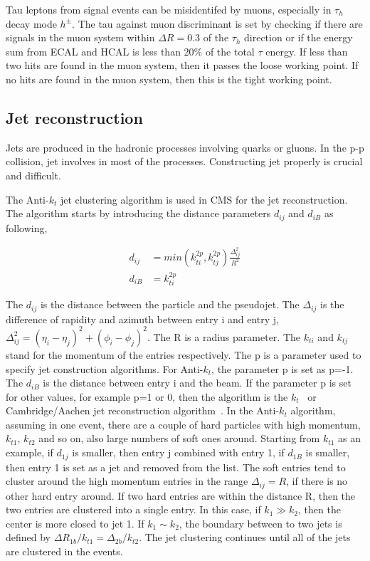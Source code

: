 Tau leptons from signal events can be misidentifed by muons, especially in $\tau_{h}$ decay mode $h^{\pm}$. The tau against muon discriminant is set by checking if there are signals in the muon system within $\Delta R=0.3$ of the $\tau_{h}$ direction or if the energy sum from ECAL and HCAL is less than 20$\%$ of the total $\tau$ energy. If less than two hits are found in the muon system, then it passes the loose working point. If no hits are found in the muon system, then this is the tight working point. 

\subsection{Jet reconstruction}
Jets are produced in the hadronic processes involving quarks or gluons. In the p-p collision, jet involves in most of the processes. Constructing jet properly is crucial and difficult. 

The Anti-$k_{t}$ jet clustering algorithm is used in CMS for the jet reconstruction. The algorithm starts by introducing the distance parameters $d_{ij}$ and $d_{iB}$ as following,

\begin{align*}
d_{ij}&=min(k_{ti}^{2p},k_{tj}^{2p})\frac{\Delta_{ij}^{2}}{R^{2}}\\
d_{iB}&=k_{ti}^{2p}
\end{align*}

The $d_{ij}$ is the distance between the particle and the pseudojet. The $\Delta_{ij}$ is the difference of rapidity and azimuth between entry i and entry j, $\Delta_{ij}^{2}=(\eta_{i}-\eta_{j})^{2}+(\phi_{i}-\phi_{j})^{2}$. The R is a radius parameter. The $k_{ti}$ and $k_{tj}$ stand for the momentum of the entries respectively. The p is a parameter used to specify jet construction algorithms.  For Anti-$k_{t}$, the parameter p is set as p=-1. The $d_{iB}$ is the distance between entry i and the beam. If the parameter p is set for other values, for example p=1 or 0, then the algorithm is the $k_t$~\cite{ktalgo} or Cambridge/Aachen jet reconstruction algorithm~\cite{Aachenjetalgo}.  In the Anti-$k_{t}$ algorithm, assuming in one event, there are a couple of hard particles with high momentum, $k_{t1}$, $k_{t2}$ and so on, also large numbers of soft ones around. Starting from $k_{t1}$ as an example, if $d_{1j}$ is smaller, then entry j combined with entry 1, if $d_{1B}$ is smaller, then entry 1 is set as a jet and removed from the list. The soft entries tend to cluster around the high momentum entries in the range $\Delta_{ij}= R$, if there is no other hard entry around. If two hard entries are within the distance R, then the two entries are clustered into a single entry. In this case, if $k_{1}\gg k_{2}$, then the center is more closed to jet 1. If $k_{1}\sim k_{2}$, the boundary between to two jets is defined by $\Delta R_{1b}/k_{t1}=\Delta_{2b}/k_{t2}$. The jet clustering continues until all of the jets are clustered in the events. 

